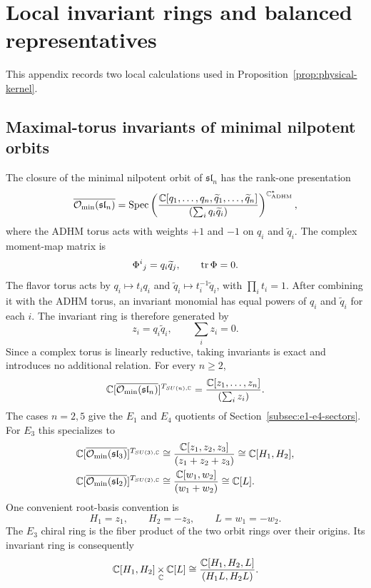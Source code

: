 \section{Local invariant rings and balanced representatives}
\label{app:local-algebra}

This appendix records two local calculations used in
Proposition~\ref{prop:physical-kernel}.

\subsection{Maximal-torus invariants of minimal nilpotent orbits}

The closure of the minimal nilpotent orbit of $\mathfrak{sl}_n$ has the
rank-one presentation
\begin{equation}
 \overline{\mathcal O_{\min}(\mathfrak{sl}_n)}
 =\operatorname{Spec}\left(
 \frac{\mathbb C[q_1,\ldots,q_n,\widetilde q_1,\ldots,\widetilde q_n]}
      {(\sum_iq_i\widetilde q_i)}
 \right)^{\mathbb C^*_{\mathrm{ADHM}}},
 \label{eq:app-adhm}
\end{equation}
where the ADHM torus acts with weights $+1$ and $-1$ on $q_i$ and
$\widetilde q_i$. The complex moment-map matrix is
\begin{equation}
 \Phi^i{}_j=q_i\widetilde q_j,
 \qquad \operatorname{tr}\Phi=0.
\end{equation}
The flavor torus acts by
$q_i\mapsto t_iq_i$ and
$\widetilde q_i\mapsto t_i^{-1}\widetilde q_i$, with $\prod_it_i=1$.
After combining it with the ADHM torus, an invariant monomial has equal powers
of $q_i$ and $\widetilde q_i$ for each $i$. The invariant ring is therefore
generated by
\begin{equation}
 z_i=q_i\widetilde q_i,
 \qquad \sum_i z_i=0.
 \label{eq:app-zi}
\end{equation}
Since a complex torus is linearly reductive, taking invariants is exact and
introduces no additional relation. For every $n\geq2$,
\begin{equation}
 \mathbb C[\overline{\mathcal O_{\min}(\mathfrak{sl}_n)}]^{T_{SU(n),\mathbb C}}
 =\frac{\mathbb C[z_1,\ldots,z_n]}{(\sum_i z_i)}.
 \label{eq:app-general-invariants}
\end{equation}
The cases $n=2,5$ give the $E_1$ and $E_4$ quotients of
Section~\ref{subsec:e1-e4-sectors}. For $E_3$ this specializes to
\begin{align}
 \mathbb C[\overline{\mathcal O_{\min}(\mathfrak{sl}_3)}]^{T_{SU(3),\mathbb C}}
 &\cong\frac{\mathbb C[z_1,z_2,z_3]}{(z_1+z_2+z_3)}
 \cong\mathbb C[H_1,H_2],\\
 \mathbb C[\overline{\mathcal O_{\min}(\mathfrak{sl}_2)}]^{T_{SU(2),\mathbb C}}
 &\cong\frac{\mathbb C[w_1,w_2]}{(w_1+w_2)}
 \cong\mathbb C[L].
\end{align}
One convenient root-basis convention is
\begin{equation}
 H_1=z_1,
 \qquad H_2=-z_3,
 \qquad L=w_1=-w_2.
 \label{eq:app-root-coordinates}
\end{equation}
The $E_3$ chiral ring is the fiber product of the two orbit rings over their
origins. Its invariant ring is consequently
\begin{equation}
 \mathbb C[H_1,H_2]\mathop{\times}_{\mathbb C}\mathbb C[L]
 \cong\frac{\mathbb C[H_1,H_2,L]}{(H_1L,H_2L)}.
\end{equation}

